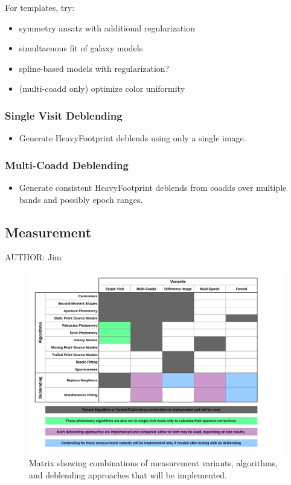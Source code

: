 For templates, try:
\begin{itemize}
\item symmetry ansatz with additional regularization
\item simultaenous fit of galaxy models
\item spline-based models with regularization?
\item (multi-coadd only) optimize color uniformity
\end{itemize}

\subsubsection{Single Visit Deblending}
\begin{itemize}
\item Generate HeavyFootprint deblends using only a single image.
\end{itemize}
\subsubsection{Multi-Coadd Deblending}
\begin{itemize}
\item Generate consistent HeavyFootprint deblends from coadds over multiple bands and possibly epoch ranges.
\end{itemize}

\subsection{Measurement}
AUTHOR: Jim

\begin{figure}
\centering
\includegraphics[width=\textwidth]{figures/measurement-matrix.pdf}
\caption{Matrix showing combinations of measurement variants, algorithms, and deblending approaches that will be implemented.
\label{fig:measurement-matrix}}
\end{figure}

